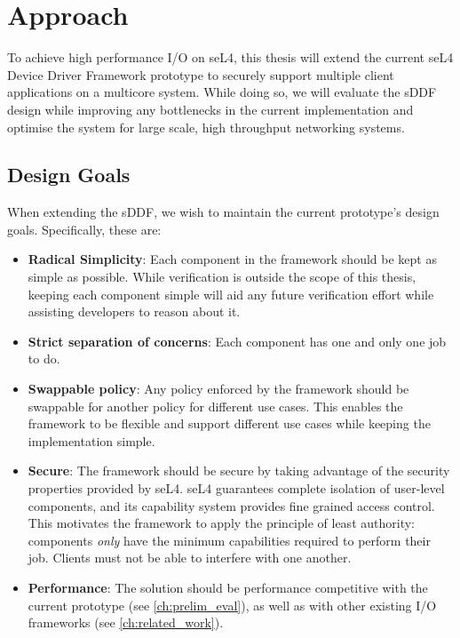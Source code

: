 \chapter{Approach}\label{ch:approach}
To achieve high performance I/O on seL4, this thesis will extend the current seL4 Device Driver Framework prototype 
to securely support multiple client applications on a multicore system. While doing so, 
we will evaluate the sDDF design while improving any bottlenecks in the current implementation
and optimise the system for large scale, high throughput networking systems.

\section{Design Goals}
When extending the sDDF, we wish to maintain the current prototype's design goals. 
Specifically, these are:
\begin{itemize}
\item \textbf{Radical Simplicity}: Each component in the framework should be kept as simple as possible. While verification is outside the scope
of this thesis, keeping each component simple will aid any future verification effort while assisting developers to reason about it.
\item \textbf{Strict separation of concerns}: Each component has one and only one job to do. 
\item \textbf{Swappable policy}: Any policy enforced by the framework should be swappable for another policy for different use cases.
This enables the framework to be flexible and support different use cases while keeping the implementation simple.
\item \textbf{Secure}: The framework should be secure by taking advantage of the security properties provided by seL4. seL4 guarantees
complete isolation of user-level components, and its capability system provides fine grained access control. This motivates the framework to apply
the principle of least authority: components \emph{only} have the minimum capabilities required to perform their job. Clients must not be able
to interfere with one another. 
\item \textbf{Performance}: The solution should be performance competitive with the current prototype (see \autoref{ch:prelim_eval}),
as well as with other existing I/O frameworks (see \autoref{ch:related_work}).
\end{itemize}

